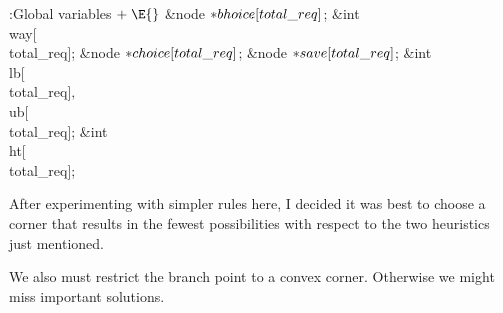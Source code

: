 \B{}:Global variables\X${}\mathrel+\E{}$\6
\&{node} ${}{*}\\{bhoice}[\\{total\_req}]{}$;\6
\&{int} \\{way}[\\{total\_req}];\6
\&{node} ${}{*}\\{choice}[\\{total\_req}]{}$;\6
\&{node} ${}{*}\\{save}[\\{total\_req}]{}$;\6
\&{int} \\{lb}[\\{total\_req}]${},{}$ \\{ub}[\\{total\_req}];\6
\&{int} \\{ht}[\\{total\_req}];\par
\fi

After experimenting with simpler rules here, I decided it
was best to
choose a corner that results in the fewest possibilities with respect to
the two heuristics just mentioned.

We also must restrict the branch point to a convex corner. Otherwise
we might miss important solutions.

